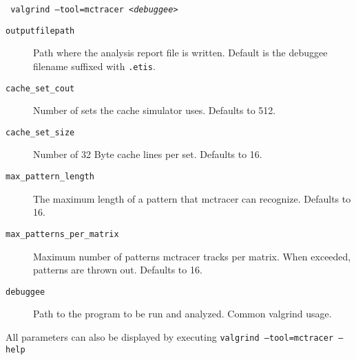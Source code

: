 \texttt{
	valgrind --tool=mctracer \newline
	[--output=<\textit{outputfilepath}>] \newline
	[--cache-sets=<cache\_set\_cout>] \newline
	[--cache-set-size=<cache\_set\_size>] \newline
	[--max-pattern-length=<max\_pattern\_length>] \newline
	[--max-patterns-per-matrix=<max\_patterns\_per\_matrix>] \newline
	<\textit{debuggee}>
}
\begin{description}
\item[\texttt{outputfilepath}] Path where the analysis report file is written. Default is the debuggee filename suffixed with \texttt{.etis}.
\item[\texttt{cache\_set\_cout}] Number of sets the cache simulator uses. Defaults to 512.
\item[\texttt{cache\_set\_size}] Number of 32 Byte cache lines per set. Defaults to 16.
\item[\texttt{max\_pattern\_length}] The maximum length of a pattern that mctracer can recognize. Defaults to 16.
\item[\texttt{max\_patterns\_per\_matrix}] Maximum number of patterns mctracer tracks per matrix. When exceeded, patterns are thrown out. Defaults to 16.
\item[\texttt{debuggee}] Path to the program to be run and analyzed. Common valgrind usage.
\end{description}
All parameters can also be displayed by executing \texttt{valgrind --tool=mctracer --help}
